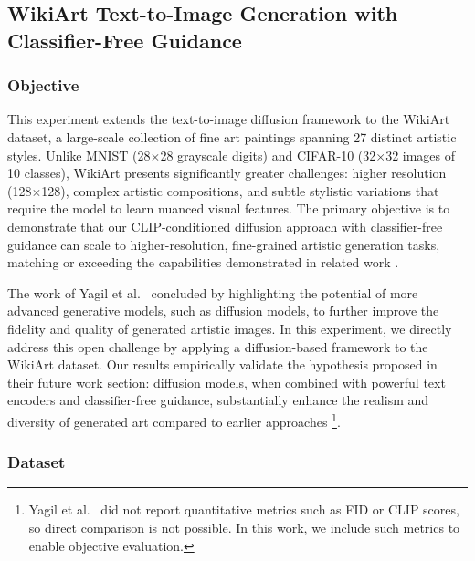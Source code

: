 \subsection{WikiArt Text-to-Image Generation with Classifier-Free Guidance}
\label{sec:wikiart}

\subsubsection{Objective}
This experiment extends the text-to-image diffusion framework to the WikiArt dataset, a large-scale collection of fine art paintings spanning 27 distinct artistic styles. Unlike MNIST (28$\times$28 grayscale digits) and CIFAR-10 (32$\times$32 images of 10 classes), WikiArt presents significantly greater challenges: higher resolution (128$\times$128), complex artistic compositions, and subtle stylistic variations that require the model to learn nuanced visual features. The primary objective is to demonstrate that our CLIP-conditioned diffusion approach with classifier-free guidance can scale to higher-resolution, fine-grained artistic generation tasks, matching or exceeding the capabilities demonstrated in related work \cite{yagil2023can}.

The work of Yagil et al.~\cite{yagil2023can} concluded by highlighting the potential of more advanced generative models, such as diffusion models, to further improve the fidelity and quality of generated artistic images. In this experiment, we directly address this open challenge by applying a diffusion-based framework to the WikiArt dataset. Our results empirically validate the hypothesis proposed in their future work section: diffusion models, when combined with powerful text encoders and classifier-free guidance, substantially enhance the realism and diversity of generated art compared to earlier approaches \footnote{Yagil et al.~\cite{yagil2023can} did not report quantitative metrics such as FID or CLIP scores, so direct comparison is not possible. In this work, we include such metrics to enable objective evaluation.}.

\subsubsection{Dataset}

